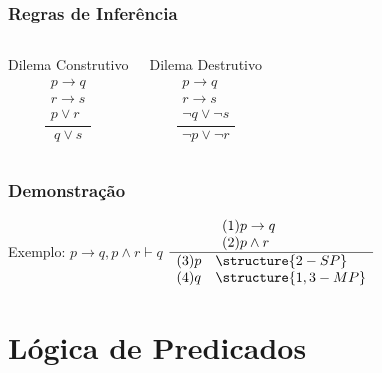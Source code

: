 \documentclass{beamer}
\begin{document}
\begin{frame}
\frametitle{Regras de Inferência}

\begin{columns}[c]
	\large
	\begin{block}{Dilema Construtivo}
		\large
		\begin{equation*}
		\frac{\begin{array}{l} p \rightarrow q \\ r \rightarrow s \\ p \vee r \end{array}}{q \vee s}
		\end{equation*}
	\end{block}	
	
	\begin{block}{Dilema Destrutivo}
		\large
		\begin{equation*}
		\frac{\begin{array}{l} p \rightarrow q \\ r \rightarrow s \\ \neg q \vee \neg s \end{array}}{\neg p \vee \neg r}
		\end{equation*}
	\end{block}	
\end{columns}
\end{frame}

\begin{frame}
\frametitle{Demonstração}

	\begin{exampleblock}{Exemplo: $p \rightarrow q, p \wedge r  \vdash q$}
		\large
		$\frac{\begin{array}{ll} (1) p \rightarrow q & ~~~~\\ (2) p \wedge r ~~~~\end{array}}{\begin{array}{ll} (3) p & \structure{2 - SP}   \\ (4) q & \structure{1,3 - MP}\end{array}}$
	\end{exampleblock}
\end{frame}

\section{Lógica de Predicados}
\end{document}
